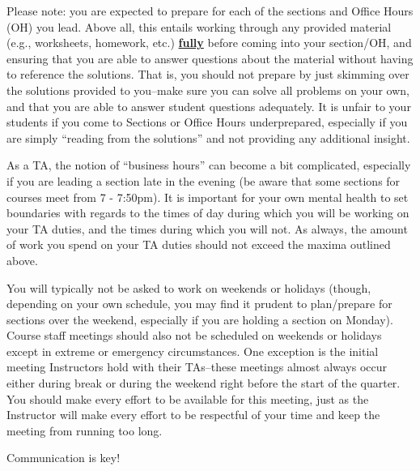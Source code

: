 \documentclass[
  letterpaper,
  DIV=11,
  numbers=noendperiod]{scrreprt}
\begin{document}
Please note: you are expected to prepare for each of the sections and
Office Hours (OH) you lead. Above all, this entails working through any
provided material (e.g., worksheets, homework, etc.) \ul{\textbf{fully}}
before coming into your section/OH, and ensuring that you are able to
answer questions about the material without having to reference the
solutions. That is, you should not prepare by just skimming over the
solutions provided to you--make sure you can solve all problems on your
own, and that you are able to answer student questions adequately. It is
unfair to your students if you come to Sections or Office Hours
underprepared, especially if you are simply ``reading from the
solutions'' and not providing any additional insight.

As a TA, the notion of ``business hours'' can become a bit complicated,
especially if you are leading a section late in the evening (be aware
that some sections for courses meet from 7 - 7:50pm). It is important
for your own mental health to set boundaries with regards to the times
of day during which you will be working on your TA duties, and the times
during which you will not. As always, the amount of work you spend on
your TA duties should not exceed the maxima outlined above.

You will typically not be asked to work on weekends or holidays (though,
depending on your own schedule, you may find it prudent to plan/prepare
for sections over the weekend, especially if you are holding a section
on Monday). Course staff meetings should also not be scheduled on
weekends or holidays except in extreme or emergency circumstances. One
exception is the initial meeting Instructors hold with their TAs--these
meetings almost always occur either during break or during the weekend
right before the start of the quarter. You should make every effort to
be available for this meeting, just as the Instructor will make every
effort to be respectful of your time and keep the meeting from running
too long.

\begin{tcolorbox}[enhanced jigsaw, leftrule=.75mm, toprule=.15mm, arc=.35mm, title=\textcolor{quarto-callout-tip-color}{\faLightbulb}\hspace{0.5em}{Tip}, coltitle=black, breakable, titlerule=0mm, opacitybacktitle=0.6, colback=white, toptitle=1mm, opacityback=0, colbacktitle=quarto-callout-tip-color!10!white, colframe=quarto-callout-tip-color-frame, bottomtitle=1mm, rightrule=.15mm, bottomrule=.15mm, left=2mm]

Communication is key!

\end{tcolorbox}
\end{document}
